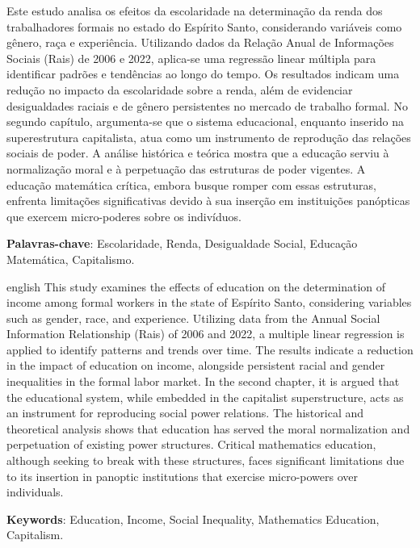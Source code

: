

\setlength{\absparsep}{18pt}
\begin{resumo}
  Este estudo analisa os efeitos da escolaridade na determinação da renda dos trabalhadores formais no estado do Espírito Santo, considerando variáveis como gênero, raça e experiência. Utilizando dados da Relação Anual de Informações Sociais (Rais) de 2006 e 2022, aplica-se uma regressão linear múltipla para identificar padrões e tendências ao longo do tempo. Os resultados indicam uma redução no impacto da escolaridade sobre a renda, além de evidenciar desigualdades raciais e de gênero persistentes no mercado de trabalho formal. No segundo capítulo, argumenta-se que o sistema educacional, enquanto inserido na superestrutura capitalista, atua como um instrumento de reprodução das relações sociais de poder. A análise histórica e teórica mostra que a educação serviu à normalização moral e à perpetuação das estruturas de poder vigentes. A educação matemática crítica, embora busque romper com essas estruturas, enfrenta limitações significativas devido à sua inserção em instituições panópticas que exercem micro-poderes sobre os indivíduos.

  \textbf{Palavras-chave}: Escolaridade, Renda, Desigualdade Social, Educação Matemática, Capitalismo.
\end{resumo}

\begin{resumo}[Abstract]
  \begin{otherlanguage*}{english}
    This study examines the effects of education on the determination of income among formal workers in the state of Espírito Santo, considering variables such as gender, race, and experience. Utilizing data from the Annual Social Information Relationship (Rais) of 2006 and 2022, a multiple linear regression is applied to identify patterns and trends over time. The results indicate a reduction in the impact of education on income, alongside persistent racial and gender inequalities in the formal labor market. In the second chapter, it is argued that the educational system, while embedded in the capitalist superstructure, acts as an instrument for reproducing social power relations. The historical and theoretical analysis shows that education has served the moral normalization and perpetuation of existing power structures. Critical mathematics education, although seeking to break with these structures, faces significant limitations due to its insertion in panoptic institutions that exercise micro-powers over individuals.

    \textbf{Keywords}: Education, Income, Social Inequality, Mathematics Education, Capitalism.
  \end{otherlanguage*}
\end{resumo}

